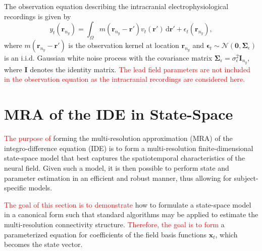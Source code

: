 \documentclass[review,authoryear,3p]{elsarticle}
\newcommand{\parham}[1]{\textcolor{red}{#1}}
\begin{document}
The observation equation describing the intracranial electrophysiological recordings is given by
\begin{equation}\label{eq:ObservationEquation}
	y_t(\mathbf{r}_{n_y}) = \int_{\Omega} { m\left(\mathbf{r}_{n_y}-\mathbf{r}'\right) v_t\left(\mathbf{r}'\right) \, \mathrm{d}\mathbf{r}'} + \epsilon_t(\mathbf{r}_{n_y}), 
\end{equation}
where $m\left(\mathbf{r}_{n_y}-\mathbf{r}'\right)$ is the observation kernel at location $\mathbf{r}_{n_y}$ and  $\boldsymbol{\epsilon}_{t}\sim \mathcal{N}\left(\mathbf{0},\mathbf{\Sigma}_{\epsilon}\right)$  is an i.i.d. Gaussian white noise process with the covariance matrix $\mathbf{\Sigma}_{\epsilon}=\sigma^2_{\epsilon}\mathbf I_{n_y}$, where $\mathbf I$ denotes the identity matrix. \parham{The lead field parameters are not included in the observation equation as the intracranial recordings are considered here.} 

\section{MRA of the IDE in State-Space}
\parham{The purpose of} forming the multi-resolution approximation (MRA) of the integro-difference equation (IDE) is to form a multi-resolution finite-dimensional state-space model that best captures the spatiotemporal characteristics of the neural field. Given such a model, it is then possible to perform state and parameter estimation in an efficient and robust manner, thus allowing for subject-specific models.

\parham{The goal of this section is to demonstrate} how to formulate a state-space model in a canonical form such that standard algorithms may be applied to estimate the multi-resolution connectivity structure. \parham{Therefore, the goal is to form} a parameterized equation for coefficients of the field basis functions $\mathbf{x}_t$, which becomes the state vector.
\end{document}
